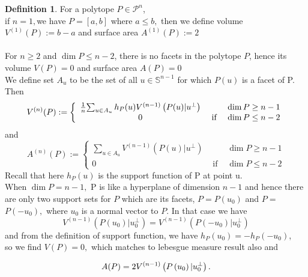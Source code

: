\documentclass[oneside]{book}
\theoremstyle{definition}
\newtheorem{mydef}{Definition}[chapter]
\begin{document}
  \begin{mydef}
For a polytope $P \in \mathcal{P}^{n}$,\\
if  $n=1,$we have  $P=[a, b]$ where $a \leq b,$ then we define volume $V^{(1)}(P):=b-a$ and  surface area $A^{(1)}(P):=2$ 
\\\\
  For  $ n \geq 2  $ and $\operatorname{dim} P \leq n-2$, there is no facets in the polytope $P$, hence its volume $V(P)=0$ and surface area $A(P)=0$ \\
  
 We define set $A_{{u}}$ to be the set of all $u \in \mathbb{S}^{n-1}$ for which $P(u)$ is a facet of P. Then 
\begin{equation}
\label{eq43}
V^{(n)}(P):=\left\{\begin{array}{ccc}
\frac{1}{n} $$ \sum_{u \in A_{u}} h_{P}(u) V^{(n-1)}\left(P(u) | u^{\perp}\right) & & \operatorname{dim} P \geq n-1 \\
0 & \text { if } & \operatorname{dim} P \leq n-2
\end{array}\right.
\end{equation}
and
\begin{equation}
\label{eq44}
A^{(n)}(P):=\left\{\begin{array}{ccc}
\sum_{u \in A_{u}} V^{(n-1)}\left(P(u) | u^{\perp}\right) & & \operatorname{dim} P \geq n-1 \\
0 & \text { if } & \operatorname{dim} P \leq n-2
\end{array}\right.
\end{equation}
Recall that here $h_{P}(u)$ is the support function of P at point u. \\
 When $\operatorname{dim} P=n-1, $ P is like a hyperplane of dimension $n - 1$  and hence there are only two support sets for $P$ which are its facets, $P=P\left(u_{0}\right)$ and $P=$ $P\left(-u_{0}\right),$ where $u_{0}$ is a normal vector to $P .$ In that case we have $$V^{(n-1)}\left(P\left(u_{0}\right) | u_{0}^{\perp}\right)=V^{(n-1)}\left(P\left(-u_{0}\right) | u_{0}^{\perp}\right)$$
 \newpage
and from the  definition of support function, we have $h_{P}\left(u_{0}\right)=-h_{P}\left(-u_{0}\right)$,\\ so we find $V(P)=0,$ which matches to lebesgue measure result also  and 
 
 \begin{equation}
 \label{eq45}
 A(P)=2 V^{(n-1)}\left(P\left(u_{0}\right) | u_{0}^{\perp}\right).\\\\
\end{equation}
\end{mydef} 
\end{document}
